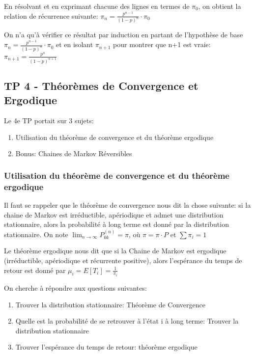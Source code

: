 \documentclass{article}
\begin{document}
En résolvant et en exprimant chacune des lignes en termes de $\pi _0$,
on obtient la relation de récurrence suivante:
$ \pi_n = \frac{p^{n-1}}{(1-p)^n} \cdot \pi_0$

On n'a qu'à vérifier ce résultat par induction en partant de l'hypothèse
de base $ \pi_n = \frac{p^{n-1}}{(1-p)^n} \cdot \pi_0$ et en isolant
$\pi_{n+1}$ pour montrer que n+1 est vraie: $\pi_{n+1} = \frac{p^n}{(1-p)^{n+1}} $

\subsection{TP 4 - Théorèmes de Convergence et Ergodique}

Le 4e TP portait sur 3 sujets:
\begin{enumerate}
    \item Utilisation du théorème de convergence et du théorème ergodique
    \item Bonus: Chaines de Markov Réversibles
\end{enumerate}

\subsubsection{Utilisation du théorème de convergence et du théorème ergodique}

Il faut se rappeler que le théorème de convergence nous dit la chose
suivante: si la chaine de Markov est irréductible, apériodique et admet une
distribution stationnaire, alors la probabilité à long terme est donné par
la distribution stationnaire. On note
$ \lim_{n \to \infty} P_{0k} ^{(n)} = \pi$, où
$\pi = \pi \cdot P$ et $\sum \pi _i = 1$

Le théorème ergodique nous dit que si la Chaine de Markov est ergodique
(irréductible, apériodique et récurrente positive), alors l'espérance
du temps de retour est donné par $\mu _i = E[T_i] = \frac{1}{\pi _i}$

On cherche à répondre aux questions suivantes:
\begin{enumerate}
    \item Trouver la distribution stationnaire: Théorème de Convergence
    \item Quelle est la probabilité de se retrouver à l'état i à long
	terme: Trouver la distribution stationnaire
    \item Trouver l'espérance du temps de retour: théorème ergodique
\end{enumerate}
\end{document}
